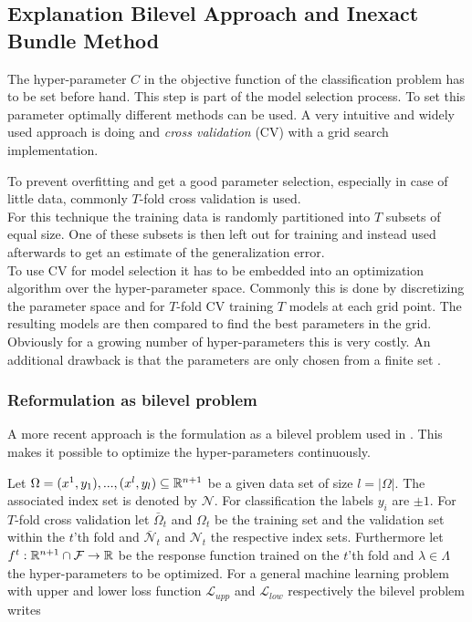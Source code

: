 \subsection{Explanation Bilevel Approach and Inexact Bundle Method}

The hyper-parameter \(C\) in the objective function of the classification problem has to be set before hand. This step is part of the model selection process.
To set this parameter optimally different methods can be used.
A very intuitive and widely used approach is doing  and \emph{cross validation} (CV) with a grid search implementation.

To prevent overfitting and get a good parameter selection, especially in case of little data, commonly \(T\)-fold cross validation is used. \\
For this technique the training data is randomly partitioned into \(T\) subsets of equal size. One of these subsets is then left out for training and instead used afterwards to get an estimate of the generalization error.  \\
To use CV for model selection it has to be embedded into an optimization algorithm over the hyper-parameter space. 
Commonly this is done by discretizing the parameter space and for \(T\)-fold CV training \(T\) models at each grid point. The resulting models are then compared to find the best parameters in the grid.
Obviously for a growing number of hyper-parameters this is very costly. An additional drawback is that the parameters are only chosen from a finite set \cite{Kunapuli2008}.

\subsubsection{Reformulation as bilevel problem}

A more recent approach is the formulation as a bilevel problem used in \cite{Kunapuli2008, Moore2011}.
This makes it possible to optimize the hyper-parameters continuously.


Let \(\Omega = {(x^1,y_1),...,(x^l,y_l)} \subseteq \mathbb{R}^{n+1}\) be a given data set of size \(l = |\Omega|\). The associated index set is denoted by \(\mathcal{N}\). For classification the labels \(y_i\) are \(\pm1\).
For \(T\)-fold cross validation let \(\bar{\Omega}_t\) and \(\Omega_t\) be the training set and the validation set within the \(t\)'th fold and \(\bar{\mathcal{N}}_t\) and \(\mathcal{N}_t\) the respective index sets.
Furthermore let \(f^t:\mathbb{R}^{n+1}\cap\mathcal{F} \to \mathbb{R}\) be the response function trained on the \(t\)'th fold and \(\lambda \in \Lambda\) the hyper-parameters to be optimized.
For a general machine learning problem with upper and lower loss function \(\mathcal{L}_{upp}\) and \(\mathcal{L}_{low}\) respectively the bilevel problem writes
 
